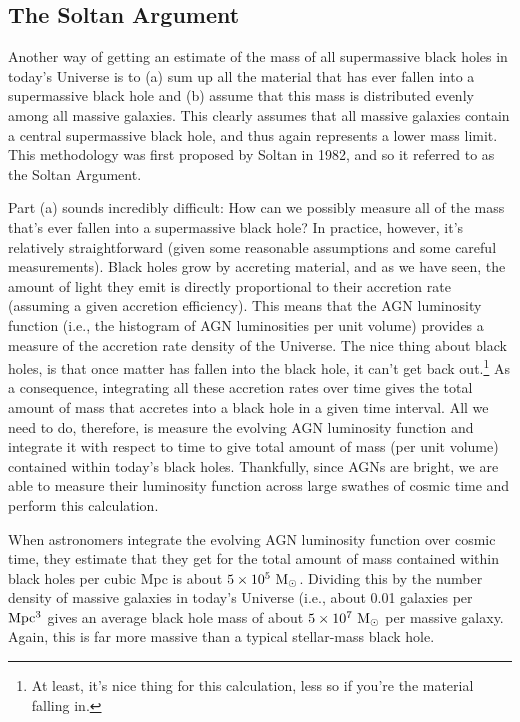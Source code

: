 \documentclass[11pt]{article}
\begin{document}
\subsection{The Soltan Argument}
Another way of getting an estimate of the mass of all supermassive
black holes in today's Universe is to (a) sum up all the material that
has ever fallen into a supermassive black hole and (b) assume that
this mass is distributed evenly among all massive galaxies. This
clearly assumes that all massive galaxies contain a central
supermassive black hole, and thus again represents a lower mass
limit. This methodology was first proposed by Soltan in 1982, and so it
referred to as the Soltan Argument.

Part (a) sounds incredibly difficult: How can we possibly measure all
of the mass that's ever fallen into a supermassive black hole? In
practice, however, it's relatively straightforward (given some
reasonable assumptions and some careful measurements). Black holes
grow by accreting material, and as we have seen, the amount of light
they emit is directly proportional to their accretion rate (assuming a
given accretion efficiency). This means that the AGN luminosity
function (i.e., the histogram of AGN luminosities per unit volume)
provides a measure of the accretion rate density of the Universe. The
nice thing about black holes, is that once matter has fallen into the
black hole, it can't get back out.\footnote{At least, it's nice thing
  for this calculation, less so if you're the material falling in.} As
a consequence, integrating all these accretion rates over time gives
the total amount of mass that accretes into a black hole in a given
time interval. All we need to do, therefore, is measure the evolving
AGN luminosity function and integrate it with respect to time to give
total amount of mass (per unit volume) contained within today's black
holes. Thankfully, since AGNs are bright, we are able to measure their
luminosity function across large swathes of cosmic time and perform
this calculation.

When astronomers integrate the evolving AGN luminosity function over
cosmic time, they estimate that they get for the total amount of mass
contained within black holes per cubic Mpc is about
$5\times10^5~{\rm M_\odot}$.  Dividing this by the number density of
massive galaxies in today's Universe (i.e., about 0.01 galaxies per
${\rm Mpc^3}$ gives an average black hole mass of about
$5\times10^7~{\rm M_\odot}$ per massive galaxy. Again, this is far
more massive than a typical stellar-mass black hole.
\end{document}
